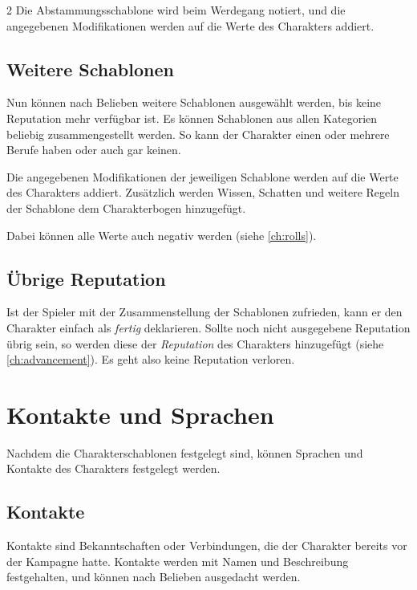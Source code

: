 \begin{multicols}{2}
Die Abstammungsschablone wird beim Werdegang notiert, und die angegebenen Modifikationen werden auf die Werte des Charakters addiert.

\subsection{Weitere Schablonen}

Nun können nach Belieben weitere Schablonen ausgewählt werden, bis keine Reputation mehr verfügbar ist. Es können Schablonen aus allen Kategorien beliebig zusammengestellt werden. So kann der Charakter einen oder mehrere Berufe haben oder auch gar keinen.

Die angegebenen Modifikationen der jeweiligen Schablone werden auf die Werte des Charakters addiert. Zusätzlich werden Wissen, Schatten und weitere Regeln der Schablone dem Charakterbogen hinzugefügt.

Dabei können alle Werte auch negativ werden (siehe \cref{ch:rolls}).

\subsection{Übrige Reputation}

Ist der Spieler mit der Zusammenstellung der Schablonen zufrieden, kann er den Charakter einfach als \textit{fertig} deklarieren. Sollte noch nicht ausgegebene Reputation übrig sein, so werden diese der \textit{Reputation} des Charakters hinzugefügt (siehe \cref{ch:advancement}). Es geht also keine Reputation verloren.

\section{Kontakte und Sprachen}

Nachdem die Charakterschablonen festgelegt sind, können Sprachen und Kontakte des Charakters festgelegt werden.

\subsection{Kontakte}

Kontakte sind Bekanntschaften oder Verbindungen, die der Charakter bereits vor der Kampagne hatte. Kontakte werden mit Namen und Beschreibung festgehalten, und können nach Belieben ausgedacht werden.


\end{multicols}

